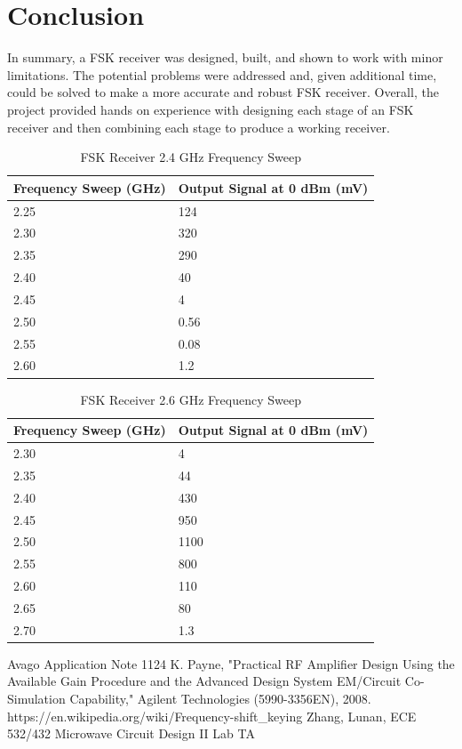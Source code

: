 \documentclass[conference]{IEEEtran}
\begin{document}
\section{Conclusion}
In summary, a FSK receiver was designed, built, and shown to work with minor limitations.  The potential problems were addressed and, given additional time, could be solved to make a more accurate and robust FSK receiver.  Overall, the project provided hands on experience with designing each stage of an FSK receiver and then combining each stage to produce a working receiver.
\begin{table}
\caption{FSK Receiver 2.4 GHz Frequency Sweep}
\begin{tabular}{|l|l|}
\hline
Frequency Sweep (GHz) & Output Signal at 0 dBm (mV) \\\hline
2.25 & 124 \\\hline
2.30 & 320 \\\hline
2.35 & 290 \\\hline
2.40 & 40 \\\hline
2.45 & 4 \\\hline
2.50 & 0.56 \\\hline
2.55 & 0.08 \\\hline
2.60 & 1.2 \\\hline
\end{tabular}
\label{tab:fsk24}
\end{table}

\begin{table}
\caption{FSK Receiver 2.6 GHz Frequency Sweep}
\begin{tabular}{|l|l|}
\hline
Frequency Sweep (GHz) & Output Signal at 0 dBm (mV) \\ \hline
2.30 & 4 \\ \hline
2.35 & 44 \\ \hline
2.40 & 430 \\ \hline
2.45 & 950 \\ \hline
2.50 & 1100 \\ \hline
2.55 & 800 \\\hline
2.60 & 110 \\ \hline
2.65 & 80 \\\hline
2.70 & 1.3 \\\hline
\end{tabular}
\label{tab:fsk26}
\end{table}

\begin{thebibliography}{1}
Avago Application Note 1124
K. Payne, "Practical RF Amplifier Design Using the Available Gain Procedure and the Advanced Design System EM/Circuit Co-Simulation Capability," Agilent Technologies (5990-3356EN), 2008.
https://en.wikipedia.org/wiki/Frequency-shift\_keying
Zhang, Lunan, ECE 532/432 Microwave Circuit Design II Lab TA
\end{thebibliography}
\end{document}
